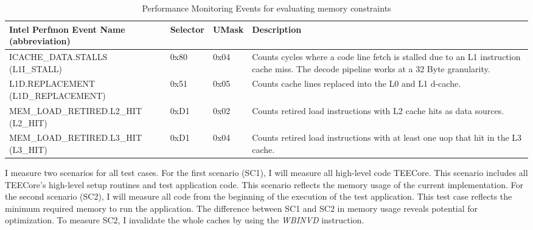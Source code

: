 \begin{table}[ht]
    \centering
    \begin{tabular}{ |p{6cm}|p{1.35cm}|p{1.25cm}|p{4cm}|}
        \hline
        \makecell[l]{Intel Perfmon Event Name                                                                                                 \\ (abbreviation)} & Selector & UMask & Description                                                                      \\
        \hline
        \makecell[l]{ICACHE\_DATA.STALLS                                                                                                      \\(L1I\_STALL)}       & 0x80     & 0x04  & Counts cycles where a code line fetch is stalled due to an L1 instruction cache miss. The decode pipeline works at a 32 Byte granularity. \\
        \makecell[l]{L1D.REPLACEMENT                                                                                                          \\ (L1D\_REPLACEMENT)} & 0x51 & 0x05 & Counts cache lines replaced into the L0 and L1 d-cache.                          \\
        MEM\_LOAD\_RETIRED.L2\_HIT (L2\_HIT) & 0xD1 & 0x02 & Counts retired load instructions with L2 cache hits as data sources.             \\
        MEM\_LOAD\_RETIRED.L3\_HIT (L3\_HIT) & 0xD1 & 0x04 & Counts retired load instructions with at least one uop that hit in the L3 cache. \\
        \hline
    \end{tabular}
    \caption{Performance Monitoring Events for evaluating memory constraints}
    \label{50:tab:events}
\end{table}

I measure two scenarios for all test cases. For the first scenario (SC1), I will
measure all high-level code TEECore. This scenario includes all TEECore's
high-level setup routines and test application code. This scenario reflects the
memory usage of the current implementation. For the second scenario (SC2), I
will measure all code from the beginning of the execution of the test
application. This test case reflects the minimum required memory to run the
application. The difference between SC1 and SC2 in memory usage reveals
potential for optimization. To measure SC2, I invalidate the whole caches by
using the \textit{WBINVD} instruction. \\

